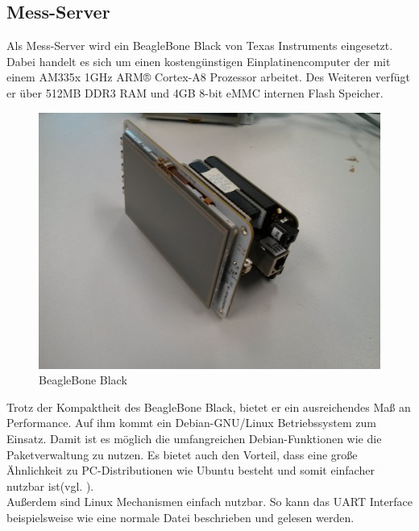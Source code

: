 
\newpage
\subsection{Mess-Server}
\label{section_Mess-Server}

Als Mess-Server wird ein BeagleBone Black von Texas Instruments eingesetzt. Dabei handelt es sich um einen kostengünstigen Einplatinencomputer der mit einem AM335x 1GHz ARM® Cortex-A8 Prozessor arbeitet. Des Weiteren verfügt er über 512MB DDR3 RAM und 4GB 8-bit eMMC internen Flash Speicher.


\begin{figure}[H]
\begin{center}
\includegraphics[width=\textwidth]{img/general/BeagleBoneBlack.jpg}
\caption{BeagleBone Black}
\label{figure_Beagleboneblack}
\end{center}
\end{figure}

Trotz der Kompaktheit des BeagleBone Black, bietet er ein ausreichendes Maß an Performance. Auf ihm kommt ein Debian-GNU/Linux Betriebssystem zum Einsatz. Damit ist es möglich die umfangreichen Debian-Funktionen wie die Paketverwaltung zu nutzen. Es bietet auch den Vorteil, dass eine große Ähnlichkeit zu PC-Distributionen wie Ubuntu besteht und somit einfacher nutzbar ist(vgl. \cite{schroeder2009embedded}).\\
Außerdem sind Linux Mechanismen einfach nutzbar. So kann das \ac{UART} Interface beispielsweise wie eine normale Datei beschrieben und gelesen werden.

